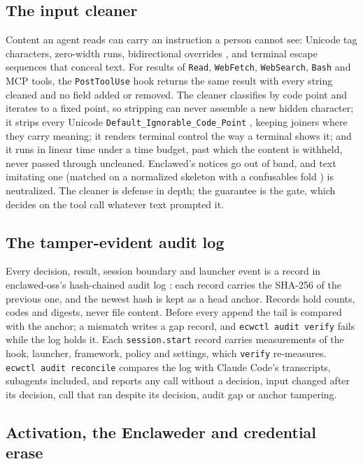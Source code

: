 \documentclass[11pt]{article}
\newcommand{\sys}{Enclawed}
\newcommand{\dev}{Enclaweder}
\begin{document}
\subsection{The input cleaner}
\label{sec:cleaner}

Content an agent reads can carry an instruction a person cannot see:
Unicode tag characters, zero-width runs, bidirectional overrides
\cite{boucher2023trojan,boucher2022bad}, and terminal escape sequences
that conceal text. For results of \texttt{Read}, \texttt{WebFetch},
\texttt{WebSearch}, \texttt{Bash} and MCP tools, the \texttt{PostToolUse}
hook returns the same result with every string cleaned and no field
added or removed. The cleaner classifies by code point and iterates to a
fixed point, so stripping can never assemble a new hidden character; it
strips every Unicode \texttt{Default\_Ignorable\_Code\_Point}
\cite{uax44}, keeping joiners where they carry meaning; it renders
terminal control the way a terminal shows it; and it runs in linear time
under a time budget, past which the content is withheld, never passed
through uncleaned. \sys{}'s notices go out of band, and text imitating
one (matched on a normalized skeleton with a confusables fold
\cite{uts39}) is neutralized. The cleaner is defense in depth; the
guarantee is the gate, which decides on the tool call whatever text
prompted it.

\subsection{The tamper-evident audit log}
\label{sec:audit}

Every decision, result, session boundary and launcher event is a record
in enclawed-oss's hash-chained audit log
\cite{schneier1999audit,crosby2009tamper}: each record carries the
SHA-256 of the previous one, and the newest hash is kept as a head
anchor. Records hold counts, codes and digests, never file content.
Before every append the tail is compared with the anchor; a mismatch
writes a gap record, and \texttt{ecwctl audit verify} fails while the
log holds it. Each \texttt{session.start} record carries measurements of
the hook, launcher, framework, policy and settings, which \texttt{verify}
re-measures. \texttt{ecwctl audit reconcile} compares the log with
Claude Code's transcripts, subagents included, and reports any call
without a decision, input changed after its decision, call that ran
despite its decision, audit gap or anchor tampering.

\subsection{Activation, the \dev{} and credential erase}
\label{sec:auth}
\label{sec:hw}
\label{sec:erase}
\label{sec:managed}
\end{document}
